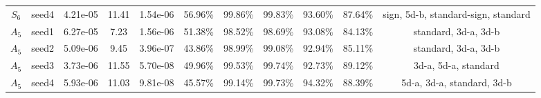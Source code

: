 \begin{tabular}{ccccccccccc}
  $S_{6}$ & seed4 &  4.21e-05 &         11.41 &        1.54e-06 &   56.96\% &   99.86\% &   99.83\% &   93.60\% & 87.64\% &                    sign, 5d-b, standard-sign, standard \\
  $A_{5}$ & seed1 &  6.27e-05 &          7.23 &        1.56e-06 &   51.38\% &   98.52\% &   98.69\% &   93.08\% & 84.13\% &                                   standard, 3d-a, 3d-b \\
  $A_{5}$ & seed2 &  5.09e-06 &          9.45 &        3.96e-07 &   43.86\% &   98.99\% &   99.08\% &   92.94\% & 85.11\% &                                   standard, 3d-a, 3d-b \\
  $A_{5}$ & seed3 &  3.73e-06 &         11.55 &        5.70e-08 &   49.96\% &   99.53\% &   99.74\% &   92.73\% & 89.12\% &                                   3d-a, 5d-a, standard \\
  $A_{5}$ & seed4 &  5.93e-06 &         11.03 &        9.81e-08 &   45.57\% &   99.14\% &   99.73\% &   94.32\% & 88.39\% &                             5d-a, 3d-a, standard, 3d-b \\
\bottomrule
\end{tabular}
